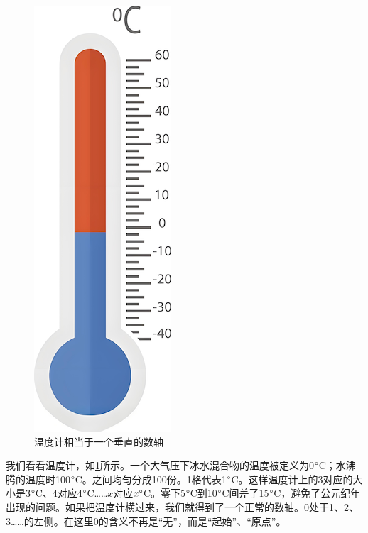 \documentclass[b5paper]{ctexart}
\begin{document}
\begin{figure}[htbp]
 \centering
 \includegraphics[scale=0.35]{img/thermometer}
 \caption{温度计相当于一个垂直的数轴}
 \label{fig:thermometer}
\end{figure}

我们看看温度计，如\cref{fig:thermometer}所示。一个大气压下冰水混合物的温度被定义为0$\degree$C；水沸腾的温度时100$\degree$C。之间均匀分成100份。1格代表1$\degree$C。这样温度计上的3对应的大小是3$\degree$C、4对应4$\degree$C……$x$对应$x \degree$C。零下5$\degree$C到10$\degree$C间差了15$\degree$C，避免了公元纪年出现的问题。如果把温度计横过来，我们就得到了一个正常的数轴。0处于1、2、3……的左侧。在这里0的含义不再是“无”，而是“起始”、“原点”。

\begin{center}
\end{center}
\end{document}
